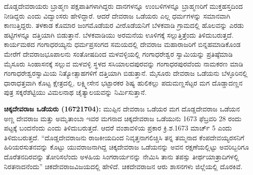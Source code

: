 ದೊಡ್ಡದೇವರಾಯರು ಬ್ರಾಹ್ಮಣ ಪಕ್ಷಪಾತಿಗಳಾಗಿದ್ದರು ದಾನಗಳನ್ನೂ ಉಂಬಳಿಗಳನ್ನೂ ಬ್ರಾಹ್ಮಣರಿಗೆ ಮುಕ್ತಹಸ್ತದಿಂದ ನೀಡಿದ್ದರು ಎಂದು ವಿದ್ವಾಂಸರು ಹೇಳಿದ್ದಾರೆ. ಆದರೆ ದೇವರಾಜ ಒಡೆಯರು ಎಲ್ಲ ಧರ್ಮಗಳನ್ನು ಸಮಾನವಾಗಿ ಕಾಣುತ್ತಿದ್ದರು. ತಳಕಾಡ ಕೊಮಾರ ಜಂಗಮೊಡೆಯರ ವೀರೊಡೆಯನಿಗೆ ಬೆಳಕವಾಡಿ ಗ್ರಾಮದಲ್ಲಿ ಹೊಲವನ್ನು ಎರಡು ಹಟ್ಟಿಗಳನ್ನೂ ದತ್ತಿಯಾಗಿ ಬಿಡುತ್ತಾನೆ. ಬೆಳಕವಾಡಿಯು ಅರಮನೆಯ ಊಳಿಗಕ್ಕೆ ಸಲ್ಲುತ್ತಿತ್ತೆಂದು ತಿಳಿದುಬರುತ್ತದೆ. ಕಾರ್ಯಮಠದ ಗಂಗಾಧರಯ್ಯನು ಧರ್ಮಪ್ರಸಂಗದ ಸಮಯದಲ್ಲಿ ದೇವರಾಜ ಮಹಾರಾಜರಿಗೆ ಬಿನ್ನಹಮಾಡಿಕೊಂಡ ಮೇರೆಗೆ ದೇವರಾಜಭೂಪಾಲನು ಸಂತೋಷದಿಂದ ಮಳವಳ್ಳಿಯಲ್ಲಿ ಗಂಗಾಧರೇಶ್ವರ ಸ್ವಾಮಿಯನ್ನು ಪ್ರತಿಷ್ಠೆಮಾಡಿ ಮೈಸೂರು ಸಿಂಹಾಸನಕ್ಕೆ ಸಲ್ಲುವ ಮಳವಳ್ಳಿ ಸ್ಥಳದ ಸಸಿಯಾಲದಪುರವನ್ನು ಗಂಗಾಧರಪುರವೆಂದು ನಾಮಕರಣ ಮಾಡಿ ಗಂಗಾಧರೇಶ್ವರ\-ಸ್ವಾಮಿಯ ನಿತ್ಯೋತ್ಸಾಹಗಳಿಗೆ ದತ್ತಿಯಾಗಿ ಬಿಡುತ್ತಾನೆ. ಮೈಸೂರು ದೇವರಾಜ ಒಡೆಯನು ಬೆಳ್ಳೂರಿನಲ್ಲಿ ಧಾರಾಧತ್ತವಾಗಿ ಕೊಟ್ಟ ಕ್ಷೇತ್ರದಲ್ಲಿ, ಲಕ್ಷ್ಮೀಸೇನ ಭಟ್ಟಾರಕರ ಶಿಷ್ಯ ಹುಲಿಕಲ್ಲು ಪದುಮಣ್ಣಸೆಟ್ಟರ ಮಗ ದೊಡ್ಡಾದಣ್ಣನ ಪುತ್ರ ಸಕ್ಕರೆಶೆಟ್ಟಿಯು ವಿಮಲನಾಥ ಚೈತ್ಯಾಲಯವನ್ನು ನಿರ್ಮಿಸುತ್ತಾನೆ.

\textbf{ ಚಿಕ್ಕದೇವರಾಜ ಒಡೆಯರು (16721704):} ಮುಪ್ಪಿನ ದೇವರಾಜ ಒಡೆಯರ ಮಗ ದೊಡ್ಡದೇವರಾಜ ಒಡೆಯನ ಅಣ್ಣ ದೇವರಾಜ ಮತ್ತು ಅಮೃತಾಂಬಾ ಇವರ ಮಗನಾದ ಚಿಕ್ಕದೇವರಾಜ ಒಡೆಯುನು 1673 ಫೆಬ್ರವರಿ 28 ರಂದು ಪಟ್ಟಕ್ಕೆ ಬಂದನೆಂದು ಎಂದು ತಿಳಿದುಬರುತ್ತದೆ. ಆದರೆ ವಂಶಾವಳಿಯ ಪ್ರಕಾರ ಕ್ರಿ.ಶ.1673 ಮಾರ್ಚ್ 5 ಎಂದು ತಿಳಿದುಬರುತ್ತದೆ. “ದೊಡ್ಡದೇವರಾಜನು ರಾಜಕೀಯದಿಂದ ನಿವೃತ್ತನಾಗಲಿಚ್ಚಿಸಿ ತನ್ನ ತಮ್ಮನಾದ ಕೆಂಪದೇವಯ್ಯರಸನಿಗೆ ಹಿರಿಯರಸುತನವನ್ನು ಕೊಟ್ಟು ಯುವರಾಜನಾಗಿದ್ದ ಚಿಕ್ಕದೇವರಾಜ ಒಡೆಯನನ್ನು ಅವನ ರಕ್ಷಣೆಯಲ್ಲಿಟ್ಟು ಅವರಿಬ್ಬರಿಗೂ ದೊರೆತನದಿರವನ್ನು ತೋರಿಸಲೆಂದು ಅಳಹಿಯ ಸಿಂಗರಾರ್ಯನನ್ನು ನೇಮಿಸಿ ತಾನು ತಪಸ್ಸು ತೀರ್ಥಯಾತ್ರಾದಿಗಳಲ್ಲಿ ನಿರತನಾದನೆಂದು” ಚಿಕದೇವರಾಜವಿಜಯದಲ್ಲಿ ಹೇಳಿದೆ. ಚಿಕದೇವರಾಜನ ಆರು ಶಾಸನಗಳು ಜಿಲ್ಲೆಯಲ್ಲಿ ದೊರಕಿವೆ. 


